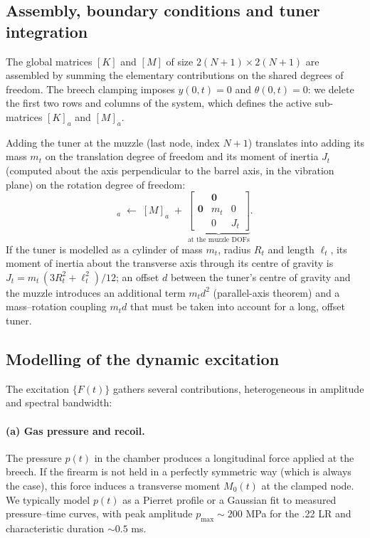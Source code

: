 \documentclass[12pt,a4paper]{article}
\begin{document}
	\subsection{Assembly, boundary conditions and tuner integration}

	The global matrices $[K]$ and $[M]$ of size $2(N+1) \times 2(N+1)$ are assembled by summing the elementary contributions on the shared degrees of freedom. The breech clamping imposes $y(0,t)=0$ and $\theta(0,t)=0$: we delete the first two rows and columns of the system, which defines the active sub-matrices $[K]_a$ and $[M]_a$.

	Adding the tuner at the muzzle (last node, index $N+1$) translates into adding its mass $m_t$ on the translation degree of freedom and its moment of inertia $J_t$ (computed about the axis perpendicular to the barrel axis, in the vibration plane) on the rotation degree of freedom:
	\begin{equation}
		[M]_a \;\longleftarrow\; [M]_a \;+\;
		\underbrace{\begin{bmatrix}
				& \mathbf{0} & \\[2pt]
				\mathbf{0} & m_t & 0 \\[2pt]
				& 0 & J_t
		\end{bmatrix}}_{\text{at the muzzle DOFs}}.
	\end{equation}
	If the tuner is modelled as a cylinder of mass $m_t$, radius $R_t$ and length $\ell_t$, its moment of inertia about the transverse axis through its centre of gravity is
	\(J_t = m_t\,(3R_t^2 + \ell_t^2)/12\); an offset $d$ between the tuner's centre of gravity and the muzzle introduces an additional term $m_t d^2$ (parallel-axis theorem) and a mass--rotation coupling $m_t d$ that must be taken into account for a long, offset tuner.

	\subsection{Modelling of the dynamic excitation}
	\label{sec:excitation}

	The excitation $\{F(t)\}$ gathers several contributions, heterogeneous in amplitude and spectral bandwidth:

	\paragraph{(a) Gas pressure and recoil.} The pressure $p(t)$ in the chamber produces a longitudinal force applied at the breech. If the firearm is not held in a perfectly symmetric way (which is always the case), this force induces a transverse moment $M_0(t)$ at the clamped node. We typically model $p(t)$ as a Pierret profile or a Gaussian fit to measured pressure--time curves, with peak amplitude $p_{\max} \sim 200$ MPa for the .22 LR and characteristic duration $\sim 0.5$ ms.
\end{document}
